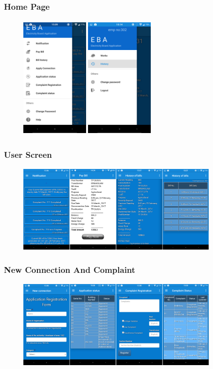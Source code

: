 \documentclass{beamer} %
\theoremstyle{definition} %
\begin{document}
\begin{frame}
\frametitle{Home Page}
\begin{figure}[center]
\includegraphics[width=3.4cm ,height=6.3cm]{homepage.png}
\vspace{4cm} 
\includegraphics[width=3.4cm ,height=6.3cm]{sslineman.png}
\end{figure}
\end{frame}

\begin{frame}
\frametitle{User Screen}
\begin{figure}[center]
\includegraphics[width=10.1cm ,height=4.5cm]{billhis.jpg} 
\end{figure}
\end{frame}

\begin{frame}
\frametitle{New Connection And Complaint}
\begin{figure}[center]
\includegraphics[width=10.1cm ,height=4.5cm]{newcompl.jpg} 
\end{figure}
\end{frame}
\end{document}
